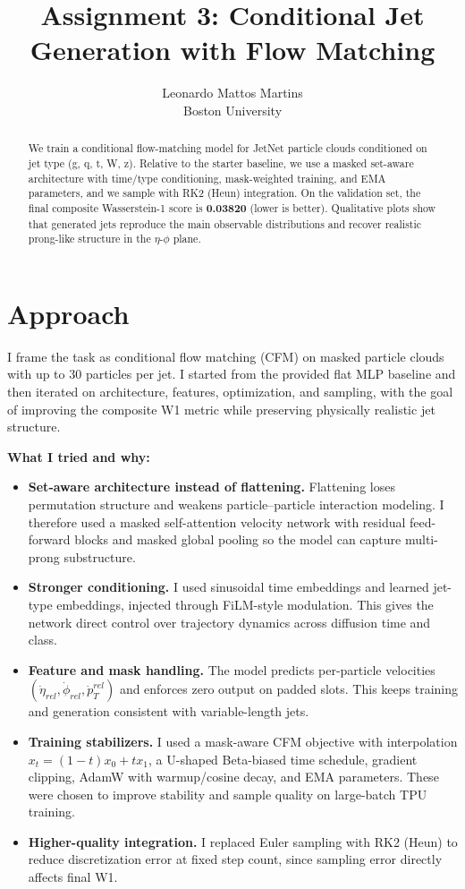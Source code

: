 \documentclass{article}
\title{Assignment 3: Conditional Jet Generation with Flow Matching}
\author{%
  Leonardo Mattos Martins \\
  Boston University
}
\begin{document}
\maketitle

\begin{abstract}
We train a conditional flow-matching model for JetNet particle clouds conditioned on jet type (g, q, t, W, z). Relative to the starter baseline, we use a masked set-aware architecture with time/type conditioning, mask-weighted training, and EMA parameters, and we sample with RK2 (Heun) integration. On the validation set, the final composite Wasserstein-1 score is \textbf{0.03820} (lower is better). Qualitative plots show that generated jets reproduce the main observable distributions and recover realistic prong-like structure in the $\eta$-$\phi$ plane.
\end{abstract}

\section{Approach}

I frame the task as conditional flow matching (CFM) on masked particle clouds with up to 30 particles per jet. I started from the provided flat MLP baseline and then iterated on architecture, features, optimization, and sampling, with the goal of improving the composite W1 metric while preserving physically realistic jet structure.

\textbf{What I tried and why:}
\begin{itemize}
    \item \textbf{Set-aware architecture instead of flattening.} Flattening loses permutation structure and weakens particle--particle interaction modeling. I therefore used a masked self-attention velocity network with residual feed-forward blocks and masked global pooling so the model can capture multi-prong substructure.
    \item \textbf{Stronger conditioning.} I used sinusoidal time embeddings and learned jet-type embeddings, injected through FiLM-style modulation. This gives the network direct control over trajectory dynamics across diffusion time and class.
    \item \textbf{Feature and mask handling.} The model predicts per-particle velocities $(\dot{\eta}_{rel},\dot{\phi}_{rel},\dot{p}_T^{rel})$ and enforces zero output on padded slots. This keeps training and generation consistent with variable-length jets.
    \item \textbf{Training stabilizers.} I used a mask-aware CFM objective with interpolation $x_t=(1-t)x_0+t x_1$, a U-shaped Beta-biased time schedule, gradient clipping, AdamW with warmup/cosine decay, and EMA parameters. These were chosen to improve stability and sample quality on large-batch TPU training.
    \item \textbf{Higher-quality integration.} I replaced Euler sampling with RK2 (Heun) to reduce discretization error at fixed step count, since sampling error directly affects final W1.
\end{itemize}
\end{document}
